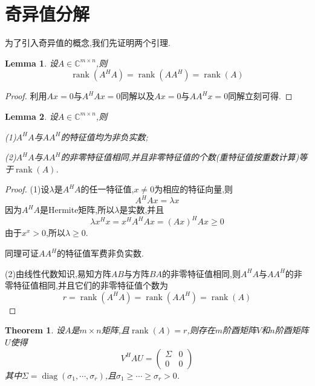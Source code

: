 \documentclass{ctexart}
\newtheorem{theorem}{Theorem}
\newtheorem{lemma}{Lemma}
\DeclareMathOperator*{\rank}{rank}
\DeclareMathOperator*{\diag}{diag}
\begin{document}
\section{奇异值分解}
    为了引入奇异值的概念,我们先证明两个引理.
    \begin{lemma}
        设$A\in\mathbb{C}^{m\times n}$,则
        $$\rank(A^HA)=\rank(AA^H)=\rank(A)$$
    \end{lemma}
    \begin{proof}
        利用$Ax=0$与$A^HAx=0$同解以及$Ax=0$与$AA^Hx=0$同解立刻可得.
    \end{proof}
    \begin{lemma}
        设$A\in\mathbb{C}^{m\times n}$,则

        (1)$A^HA$与$AA^H$的特征值均为非负实数;

        (2)$A^HA$与$AA^H$的非零特征值相同,并且非零特征值的个数(重特征值按重数计算)等于$\rank(A)$.
    \end{lemma}
    \begin{proof}
        (1)设$\lambda$是$A^HA$的任一特征值,$x\neq0$为相应的特征向量,则$$A^HAx=\lambda x$$
        因为$A^HA$是Hermite矩阵,所以$\lambda$是实数,并且$$\lambda x^Hx=x^HA^HAx=(Ax)^HAx\geq0$$
        由于$x^x>0$,所以$\lambda\geq0$.
        
        同理可证$AA^H$的特征值军费非负实数.
        
        (2)由线性代数知识,易知方阵$AB$与方阵$BA$的非零特征值相同,则$A^HA$与$AA^H$的非零特征值相同,并且它们的非零特征值个数为$$r=\rank(A^HA)=\rank(AA^H)=\rank(A)$$
    \end{proof}
    \newpage
    \begin{theorem}
        设$A$是$m\times n$矩阵,且$\rank(A)=r$,则存在$m$阶酉矩阵$V$和$n$阶酉矩阵$U$使得
        $$V^HAU=
        \begin{pmatrix}
            \Sigma & 0 \\
            0 & 0
        \end{pmatrix}
        $$
        其中$\Sigma=\diag(\sigma_1,\cdots,\sigma_r)$,且$\sigma_1\geq\cdots\geq\sigma_r>0$.
    \end{theorem}
\end{document}
